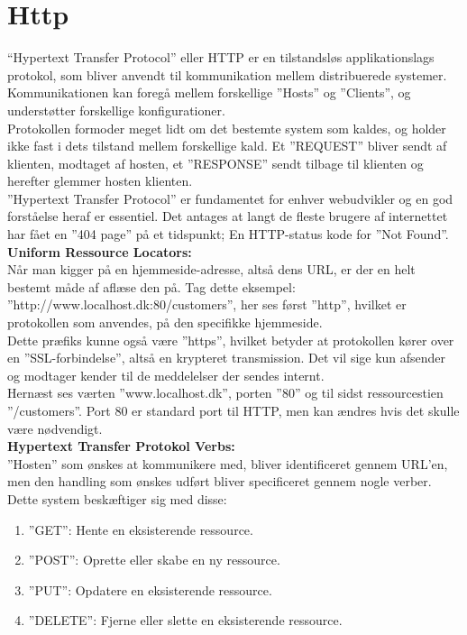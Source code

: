 \section{Http}\label{sec:http}
“Hypertext Transfer Protocol” eller HTTP er en tilstandsløs applikationslags protokol, 
som bliver anvendt til kommunikation mellem distribuerede systemer. 
Kommunikationen kan foregå mellem forskellige ”Hosts” og ”Clients”, 
og understøtter forskellige konfigurationer.\\

Protokollen formoder meget lidt om det bestemte system som kaldes, 
og holder ikke fast i dets tilstand mellem forskellige kald. 
Et ”REQUEST” bliver sendt af klienten, modtaget af hosten, 
et ”RESPONSE” sendt tilbage til klienten og herefter glemmer hosten klienten. \\

”Hypertext Transfer Protocol” er fundamentet for enhver webudvikler 
og en god forståelse heraf er essentiel. 
Det antages at langt de fleste brugere af internettet har fået en ”404 page” på et tidspunkt; 
En HTTP-status kode for ”Not Found”. \\

\textbf{Uniform Ressource Locators:}\\
Når man kigger på en hjemmeside-adresse, altså dens URL, 
er der en helt bestemt måde af aflæse den på. 
Tag dette eksempel: ”http://www.localhost.dk:80/customers”, 
her ses først ”http”, hvilket er protokollen som anvendes, på den specifikke hjemmeside. \\

Dette præfiks kunne også være ”https”, 
hvilket betyder at protokollen kører over en ”SSL-forbindelse”, 
altså en krypteret transmission. 
Det vil sige kun afsender og modtager kender til de meddelelser der sendes internt. \\

Hernæst ses værten ”www.localhost.dk”, porten ”80” og til sidst ressourcestien ”/customers”. 
Port 80 er standard port til HTTP, men kan ændres hvis det skulle være nødvendigt. \\

\textbf{Hypertext Transfer Protokol Verbs:} \\
”Hosten” som ønskes at kommunikere med, bliver identificeret gennem URL’en, 
men den handling som ønskes udført bliver specificeret gennem nogle verber. 
Dette system beskæftiger sig med disse: \\
\begin{enumerate}
    \item ”GET”: Hente en eksisterende ressource.
    \item ”POST”: Oprette eller skabe en ny ressource.
    \item ”PUT”: Opdatere en eksisterende ressource.
    \item ”DELETE”:  Fjerne eller slette en eksisterende ressource.
\end{enumerate}

